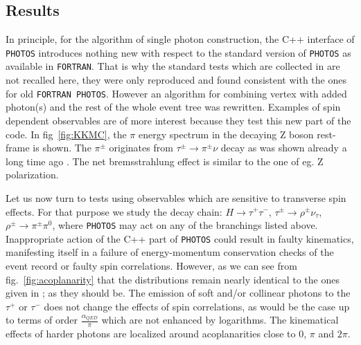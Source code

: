 \documentclass[]{Photos_interface_design}
\begin{document}
\subsection{Results}
\label{sec:results}
In principle, for the algorithm of single photon construction, the C++ interface of
{\tt PHOTOS} introduces nothing new with respect to the standard
version of {\tt PHOTOS} as available in {\tt FORTRAN}.
That is why the standard tests which are collected in \cite{Photos_tests} are not
recalled here, they were only reproduced and found consistent with the ones for
old {\tt FORTRAN PHOTOS}.
However an algorithm for combining vertex with added photon(s) and the rest of the whole event tree was rewritten.
Examples of spin dependent observables are of more interest because they test this new part of the code.
In  fig~\ref{fig:KKMC}, the $\pi$ energy spectrum in the decaying
Z boson rest-frame is shown. The $\pi^\pm$ originates from $\tau^\pm \to \pi^\pm \nu $ decay as was shown already a long time ago \cite{Boillot:1988re}. The net
bremsstrahlung  effect is similar to the one of eg. Z polarization.

Let us now turn to tests using observables which are sensitive to
transverse spin effects.  For that purpose we study the decay chain:
$H\to \tau^+\tau^-$, $\tau^\pm \to \rho^\pm \nu_\tau$, $\rho^\pm \to
\pi^\pm \pi^0$, where {\tt PHOTOS} may act on any of the branchings
listed above. Inappropriate action of the C++ part of {\tt PHOTOS}
could result in faulty kinematics, manifesting itself in a failure of
energy-momentum conservation checks of the event record or faulty spin
correlations. However, as we can see from fig.~\ref{fig:acoplanarity}
that the distributions remain nearly identical to the ones given in
\cite{tauolaC++}; as they should be. The emission of soft and/or
collinear photons to the $\tau^+$ or $\tau^-$ does not change the
effects of spin correlations, as would be the case up to terms of
order $\frac{\alpha_{QED}}{\pi}$ which are not enhanced by
logarithms. The kinematical effects of harder photons are localized
around acoplanarities close to $0$, $\pi$ and $2\pi$.
\end{document}
